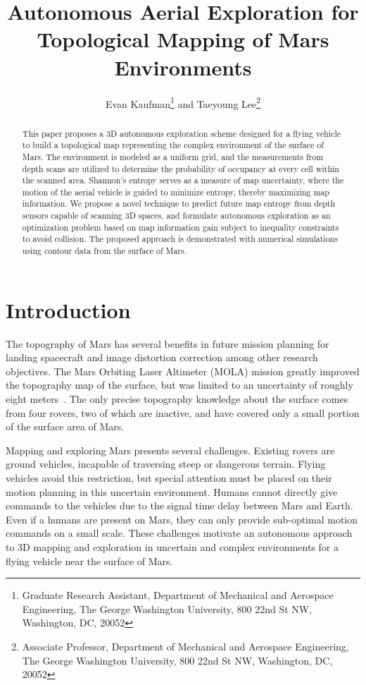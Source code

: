 \documentclass[conf]{new-aiaa}
\title{Autonomous Aerial Exploration for Topological Mapping of Mars Environments}
\author{Evan Kaufman\footnote{Graduate Research Assistant, Department of Mechanical and Aerospace Engineering, The George Washington University, 800 22nd St NW, Washington, DC, 20052} and Taeyoung Lee\footnote{Associate Professor, Department of Mechanical and Aerospace Engineering, The George Washington University, 800 22nd St NW, Washington, DC, 20052}}%
\affil{The George Washington University, Washington, DC, 20052}
\begin{document}
\maketitle

\begin{abstract}
This paper proposes a 3D autonomous exploration scheme designed for a flying vehicle to build a topological map representing the complex environment of the surface of Mars. 
The environment is modeled as a uniform grid, and the measurements from depth scans are utilized to determine the probability of occupancy at every cell within the scanned area. 
Shannon's entropy serves as a measure of map uncertainty, where the motion of the aerial vehicle is guided to minimize entropy, thereby maximizing map information. We propose a novel technique to predict future map entropy from depth sensors capable of scanning 3D spaces, and formulate autonomous exploration as an optimization problem based on map information gain subject to inequality constraints to avoid collision. The proposed approach is demonstrated with numerical simulations using contour data from the surface of Mars.
\end{abstract}


\section{Introduction}

The topography of Mars has several benefits in future mission planning for landing spacecraft and  image distortion correction among other research objectives. The Mars Orbiting Laser Altimeter (MOLA) mission greatly improved the topography map of the surface, but was limited to an uncertainty of roughly eight meters~\cite{MOLA99}. The only precise topography knowledge about the surface comes from four rovers, two of which are inactive, and have covered only a small portion of the surface area of Mars.

Mapping and exploring Mars presents several challenges. Existing rovers are ground vehicles, incapable of traversing steep or dangerous terrain. Flying vehicles avoid this restriction, but special attention must be placed on their motion planning in this uncertain environment. Humans cannot directly give commands to the vehicles due to the signal time delay between Mars and Earth. Even if a humans are present on Mars, they can only provide sub-optimal motion commands on a small scale. These challenges motivate an autonomous approach to 3D mapping and exploration in uncertain and complex environments for a flying vehicle near the surface of Mars.
\end{document}
